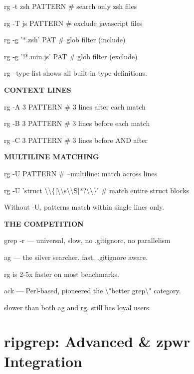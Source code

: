 \documentclass[11pt,a4paper,twoside]{book}
\begin{document}
rg -t zsh PATTERN   \# search only zsh files

rg -T js PATTERN    \# exclude javascript files

rg -g '*.zsh' PAT   \# glob filter (include)

rg -g '!*.min.js' PAT \# glob filter (exclude)

rg --type-list shows all built-in type definitions.


\vspace{12pt}
{\bfseries\color{neonyellow} CONTEXT LINES}\vspace{4pt}

rg -A 3 PATTERN     \# 3 lines after each match

rg -B 3 PATTERN     \# 3 lines before each match

rg -C 3 PATTERN     \# 3 lines before AND after


\vspace{12pt}
{\bfseries\color{neonyellow} MULTILINE MATCHING}\vspace{4pt}

rg -U PATTERN       \# --multiline: match across lines

\begin{codebox}
rg -U 'struct \textbackslash{}\textbackslash{}\{[\textbackslash{}\textbackslash{}s\textbackslash{}\textbackslash{}S]*?\textbackslash{}\textbackslash{}\}' \# match entire struct blocks\\
\end{codebox}

Without -U, patterns match within single lines only.


\vspace{12pt}
{\bfseries\color{neonyellow} THE COMPETITION}\vspace{4pt}

grep -r  — universal, slow, no .gitignore, no parallelism

ag      — the silver searcher. fast, .gitignore aware.

rg is 2-5x faster on most benchmarks.

ack     — Perl-based, pioneered the \textbackslash{}"better grep\textbackslash{}" category.

slower than both ag and rg. still has loyal users.


\vspace{16pt}

\section{ripgrep: Advanced \& zpwr Integration}
\end{document}
